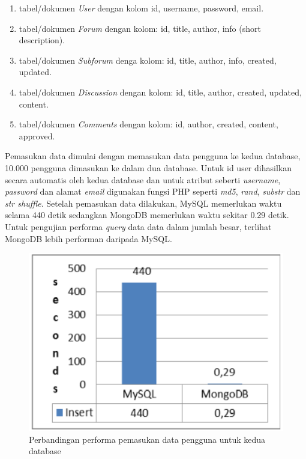 \begin{enumerate}
	\item{tabel/dokumen \textit{User} dengan kolom id, username,
		password, email.}
	\item{tabel/dokumen \textit{Forum} dengan kolom: id, title,
		author, info (short description).}
	\item{tabel/dokumen \textit{Subforum} denga kolom: id, title,
		author, info, created, updated.}
	\item{tabel/dokumen \textit{Discussion} dengan kolom: id, title,
		author, created, updated, content. }
	\item{tabel/dokumen \textit{Comments} dengan kolom: id, author,
		created, content, approved. }
\end{enumerate}

Pemasukan data dimulai dengan memasukan data pengguna ke kedua database, 10.000 pengguna dimasukan ke dalam dua database. Untuk id user dihasilkan secara automatis oleh kedua database dan untuk atribut seberti \textit{username}, \textit{password} dan alamat \textit{email} digunakan fungsi PHP seperti \textit{md5}, \textit{rand}, \textit{substr} dan \textit{str shuffle}. Setelah pemasukan data dilakukan, MySQL memerlukan waktu selama 440 detik sedangkan MongoDB memerlukan waktu sekitar 0.29 detik. Untuk pengujian performa \textit{query} data data dalam jumlah besar, terlihat MongoDB lebih performan daripada MySQL.

\begin{figure}[H]
	\centering
	\includegraphics[keepaspectratio, width=12cm]{gambar/2-grafik-mongomysql-1}
	\caption{Perbandingan performa pemasukan data pengguna untuk kedua database}
	\label{gambar:2-grafik-mongomysql-1}
\end{figure}

